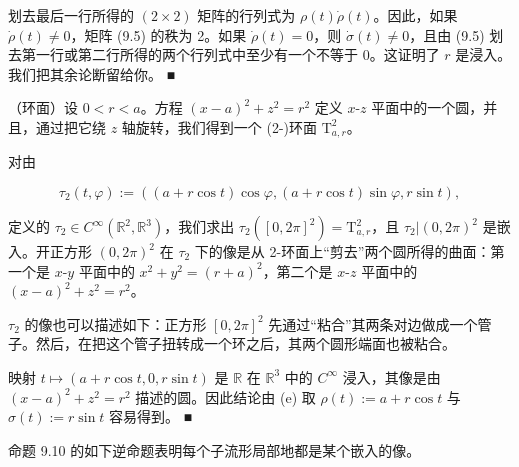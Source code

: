 \begin{example}
划去最后一行所得的 $ (2 \times 2) $ 矩阵的行列式为 $ \rho(t)\dot{\rho}(t) $。因此，如果 $ \dot{\rho}(t) \ne 0 $，矩阵 (9.5) 的秩为 2。如果 $ \dot{\rho}(t) = 0 $，则 $ \dot{\sigma}(t) \ne 0 $，且由 (9.5) 划去第一行或第二行所得的两个行列式中至少有一个不等于 0。这证明了 $ r $ 是浸入。我们把其余论断留给你。 \nobreak\hspace{0.35em}■

\begin{items}
\item[（f）]

（环面）设 $ 0 < r < a $。方程 $ (x - a)^{2} + z^{2} = r^{2} $ 定义 $ x $-$ z $ 平面中的一个圆，并且，通过把它绕 $ z $ 轴旋转，我们得到一个 (2-)环面 $ \mathrm{T}^{2}_{a,r} $。

\end{items}


对由

\[
\tau_{2}(t, \varphi) := ((a + r\cos t)\cos\varphi, (a + r\cos t)\sin\varphi, r\sin t) ,
\]

定义的 $ \tau_{2} \in C^{\infty}(\mathbb{R}^{2}, \mathbb{R}^{3}) $，我们求出 $ \tau_{2}([0, 2\pi]^{2}) = \mathrm{T}^{2}_{a,r} $，且 $ \tau_{2}|(0, 2\pi)^{2} $ 是嵌入。开正方形 $ (0, 2\pi)^{2} $ 在 $ \tau_{2} $ 下的像是从 2-环面上“剪去”两个圆所得的曲面：第一个是 $ x $-$ y $ 平面中的 $ x^{2} + y^{2} = (r + a)^{2} $，第二个是 $ x $-$ z $ 平面中的 $ (x - a)^{2} + z^{2} = r^{2} $。

$ \tau_{2} $ 的像也可以描述如下：正方形 $ [0, 2\pi]^{2} $ 先通过“粘合”其两条对边做成一个管子。然后，在把这个管子扭转成一个环之后，其两个圆形端面也被粘合。


\proofhead
映射 $ t \mapsto (a + r\cos t, 0, r\sin t) $ 是 $ \mathbb{R} $ 在 $ \mathbb{R}^{3} $ 中的 $ C^{\infty} $ 浸入，其像是由 $ (x - a)^{2} + z^{2} = r^{2} $ 描述的圆。因此结论由 (e) 取 $ \rho(t) := a + r\cos t $ 与 $ \sigma(t) := r\sin t $ 容易得到。 \nobreak\hspace{0.35em}■

命题 9.10 的如下逆命题表明每个子流形局部地都是某个嵌入的像。
\end{example}

